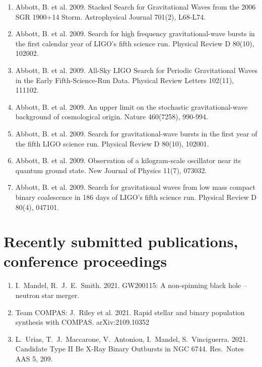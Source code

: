 \documentclass[margin,line]{res}
\begin{document}
\begin{resume}
\begin{enumerate}
\item Abbott, B. et al. 2009. Stacked Search for Gravitational Waves from the 2006 SGR 1900+14 Storm. Astrophysical Journal 701(2), L68-L74. 

\item Abbott, B. et al. 2009. Search for high frequency gravitational-wave bursts in the first calendar year of LIGO's fifth science run. Physical Review D 80(10),  102002. 

\item Abbott, B. et al. 2009. All-Sky LIGO Search for Periodic Gravitational Waves in the Early Fifth-Science-Run Data. Physical Review Letters 102(11), 111102. 

\item Abbott, B. et al. 2009. An upper limit on the stochastic gravitational-wave background of cosmological origin. Nature 460(7258), 990-994. 

\item Abbott, B. et al. 2009. Search for gravitational-wave bursts in the first year of the fifth LIGO science run. Physical Review D 80(10), 102001. 

\item Abbott, B. et al. 2009. Observation of a kilogram-scale oscillator near its quantum ground state. New Journal of Physics 11(7), 073032.

\item Abbott, B. et al. 2009. Search for gravitational waves from low mass compact binary coalescence in 186 days of LIGO's fifth science run. Physical Review D 80(4), 047101. 

\end{enumerate}

\section{\sc Recently submitted publications, conference proceedings}

\begin{enumerate}

\item I.~Mandel, R.~J.~E.~Smith.  2021.  GW200115: A non-spinning black hole -- neutron star merger.

\item Team COMPAS: J.~Riley et al. 2021.  Rapid stellar and binary population synthesis with COMPAS.  arXiv:2109.10352

\item L.~Urias, T.~J.~Maccarone, V.~Antoniou, I.~Mandel, S.~Vinciguerra.  2021.  Candidate Type II Be X-Ray Binary Outbursts in NGC 6744.  Res.~Notes AAS 5, 209.


\end{enumerate}
\end{resume}
\end{document}
